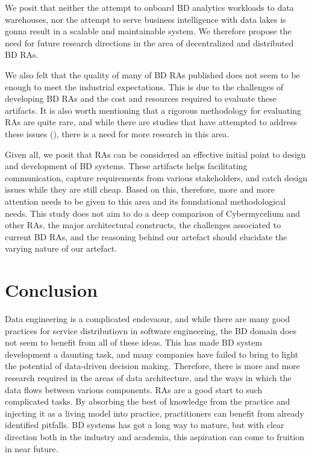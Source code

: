 \documentclass[review]{elsarticle}
\begin{document}
We posit that neither the attempt to onboard BD analytics workloads to data warehouses, nor the attempt to serve business intelligence with data lakes is gonna result in a scalable and maintainable system. We therefore propose the need for future research directions in the area of decentralized and distributed BD RAs. 

We also felt that the quality of many of BD RAs published does not seem to be enough to meet the industrial expectations. This is due to the challenges of developing BD RAs and the cost and resources required to evaluate these artifacts. It is also worth mentioning that a rigorous methodology for evaluating RAs are quite rare, and while there are studies that have attempted to address these issues (\cite{angelov2008towards}), there is a need for more research in this area.

Given all, we posit that RAs can be considered an effective initial point to design and development of BD systems. These artifacts helps facilitating communication, capture requirements from various stakeholders, and catch design issues while they are still cheap. Based on this, therefore, more and more attention needs to be given to this area and its foundational methodological needs. This study does not aim to do a deep comparison of Cybermycelium and other RAs, the major architectural constructs, the challenges associated to current BD RAs, and the reasoning behind our artefact should elucidate the varying nature of our artefact.

\section{Conclusion} \label{conclusion-section}

Data engineering is a complicated endevaour, and while there are many good practices for service distributiovn in software engineering, the BD domain does not seem to benefit from all of these ideas. This has made BD system development a daunting task, and many companies have failed to bring to light the potential of data-driven decision making. Therefore, there is more and more research required in the areas of data architecture, and the ways in which the data flows between various components. RAs are a good start to such complicated tasks. By absorbing the best of knowledge from the practice and injecting it as a living model into practice, practitioners can benefit from already identified pitfalls. BD systems has got a long way to mature, but with clear direction both in the industry and academia, this aspiration can come to fruition in near future.
\end{document}
